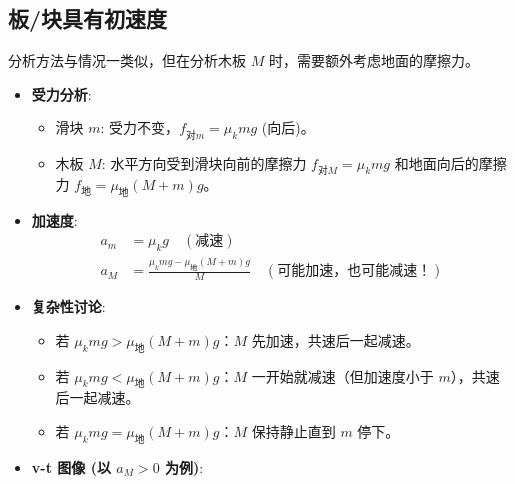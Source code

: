 \documentclass[a4paper,11pt]{ctexart}
\begin{document}
\subsection{板/块具有初速度}
分析方法与情况一类似，但在分析木板 $M$ 时，需要额外考虑地面的摩擦力。
\begin{itemize}
    \item \textbf{受力分析}:
        \begin{itemize}
            \item 滑块 $m$: 受力不变，$f_{对m} = \mu_k mg$ (向后)。
            \item 木板 $M$: 水平方向受到滑块向前的摩擦力 $f_{对M} = \mu_k mg$ 和地面向后的摩擦力 $f_{地} = \mu_{地}(M+m)g$。
        \end{itemize}
    \item \textbf{加速度}:
        \begin{align*}
            a_m &= \mu_k g \quad (\text{减速}) \\
            a_M &= \frac{\mu_k mg - \mu_{地}(M+m)g}{M} \quad (\text{可能加速，也可能减速！})
        \end{align*}
    \item \textbf{复杂性讨论}:
        \begin{itemize}
            \item 若 $\mu_k mg > \mu_{地}(M+m)g$：$M$ 先加速，共速后一起减速。
            \item 若 $\mu_k mg < \mu_{地}(M+m)g$：$M$ 一开始就减速（但加速度小于 $m$），共速后一起减速。
            \item 若 $\mu_k mg = \mu_{地}(M+m)g$：$M$ 保持静止直到 $m$ 停下。
        \end{itemize}
    \item \textbf{v-t 图像 (以 $a_M>0$ 为例)}:
    \begin{center}
    \end{center}
\end{itemize}
\end{document}
